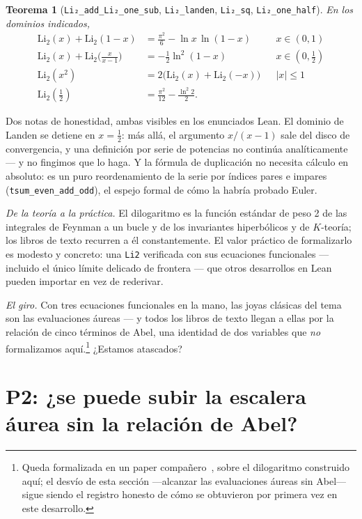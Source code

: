 \documentclass[11pt]{article}
\newtheorem{theorem}{Teorema}
\newcommand{\lean}[1]{\texttt{#1}}
\newcommand{\Li}{\mathrm{Li}_2}
\begin{document}
\begin{theorem}[{\lean{Li₂\_add\_Li₂\_one\_sub}, \lean{Li₂\_landen},
\lean{Li₂\_sq}, \lean{Li₂\_one\_half}}]\label{thm:funceq}
En los dominios indicados,
\begin{align*}
\Li(x)+\Li(1-x) &= \tfrac{\pi^2}{6}-\ln x\,\ln(1-x) && x\in(0,1)\\
\Li(x)+\Li\!\Big(\tfrac{x}{x-1}\Big) &= -\tfrac{1}{2}\ln^2(1-x) && x\in(0,\tfrac12)\\
\Li(x^2) &= 2\big(\Li(x)+\Li(-x)\big) && \lvert x\rvert\le 1\\
\Li(\tfrac12) &= \tfrac{\pi^2}{12}-\tfrac{\ln^2 2}{2}.
\end{align*}
\end{theorem}

Dos notas de honestidad, ambas visibles en los enunciados Lean. El dominio de Landen se
detiene en $x=\frac12$: m\'as all\'a, el argumento $x/(x-1)$ sale del disco de
convergencia, y una definici\'on por serie de potencias no contin\'ua anal\'iticamente
--- y no fingimos que lo haga. Y la f\'ormula de duplicaci\'on no necesita c\'alculo en
absoluto: es un puro reordenamiento de la serie por \'indices pares e impares
(\lean{tsum\_even\_add\_odd}), el espejo formal de c\'omo la habr\'ia probado Euler.

\emph{De la teor\'ia a la pr\'actica.} El dilogaritmo es la funci\'on est\'andar de peso
2 de las integrales de Feynman a un bucle y de los invariantes hiperb\'olicos y de
$K$-teor\'ia; los libros de texto recurren a \'el constantemente. El valor pr\'actico de
formalizarlo es modesto y concreto: una \lean{Li2} verificada con sus ecuaciones
funcionales --- incluido el \'unico l\'imite delicado de frontera --- que otros
desarrollos en Lean pueden importar en vez de rederivar.

\emph{El giro.} Con tres ecuaciones funcionales en la mano, las joyas cl\'asicas del
tema son las evaluaciones \'aureas --- y todos los libros de texto llegan a ellas por la
relaci\'on de cinco t\'erminos de Abel, una identidad de dos variables que \emph{no}
formalizamos aqu\'i.\footnote{Queda formalizada en un paper compa\~nero~\cite{fiveterm},
sobre el dilogaritmo construido aqu\'i; el desv\'io de esta secci\'on ---alcanzar las
evaluaciones \'aureas sin Abel--- sigue siendo el registro honesto de c\'omo se obtuvieron
por primera vez en este desarrollo.} ¿Estamos atascados?

\section{P2: ¿se puede subir la escalera \'aurea sin la relaci\'on de Abel?}
\label{sec:golden}
\end{document}
